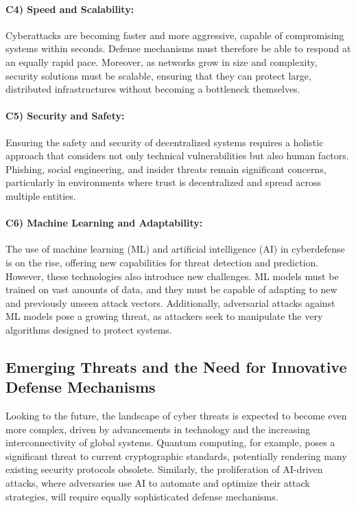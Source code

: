 \paragraph{C4) Speed and Scalability:}
Cyberattacks are becoming faster and more aggressive, capable of compromising systems within seconds. Defense mechanisms must therefore be able to respond at an equally rapid pace. Moreover, as networks grow in size and complexity, security solutions must be scalable, ensuring that they can protect large, distributed infrastructures without becoming a bottleneck themselves.

\paragraph{C5) Security and Safety:}
Ensuring the safety and security of decentralized systems requires a holistic approach that considers not only technical vulnerabilities but also human factors. Phishing, social engineering, and insider threats remain significant concerns, particularly in environments where trust is decentralized and spread across multiple entities.

\paragraph{C6) Machine Learning and Adaptability:}
The use of machine learning (ML) and artificial intelligence (AI) in cyberdefense is on the rise, offering new capabilities for threat detection and prediction. However, these technologies also introduce new challenges. ML models must be trained on vast amounts of data, and they must be capable of adapting to new and previously unseen attack vectors. Additionally, adversarial attacks against ML models pose a growing threat, as attackers seek to manipulate the very algorithms designed to protect systems.

\subsection{Emerging Threats and the Need for Innovative Defense Mechanisms}

Looking to the future, the landscape of cyber threats is expected to become even more complex, driven by advancements in technology and the increasing interconnectivity of global systems. Quantum computing, for example, poses a significant threat to current cryptographic standards, potentially rendering many existing security protocols obsolete. Similarly, the proliferation of AI-driven attacks, where adversaries use AI to automate and optimize their attack strategies, will require equally sophisticated defense mechanisms.


